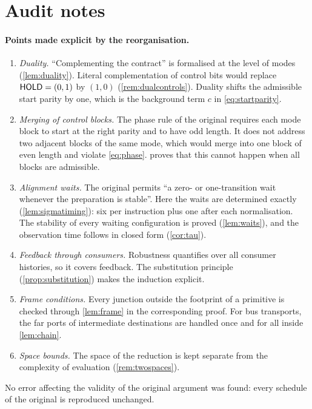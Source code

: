 \section{Audit notes}\label{app:audit}

\paragraph{Points made explicit by the reorganisation.}
\begin{enumerate}[label=(\arabic*)]
\item \emph{Duality.} ``Complementing the contract'' is formalised at the level of modes
  (\cref{lem:duality}). Literal complementation of control bits would replace $\textsf{HOLD}=(0,1)$ by
  $(1,0)$ (\cref{rem:dualcontrols}). Duality shifts the admissible start parity by one, which is the
  background term $c$ in \eqref{eq:startparity}.
\item \emph{Merging of control blocks.} The phase rule of the original requires each mode block to
  start at the right parity and to have odd length. It does not address two adjacent blocks of the
  same mode, which would merge into one block of even length and violate \eqref{eq:phase}.
   proves that this cannot happen when all blocks are admissible.
\item \emph{Alignment waits.} The original permits ``a zero- or one-transition wait whenever the
  preparation is stable''. Here the waits are determined exactly (\cref{lem:sigmatiming}): six per
  instruction plus one after each normalisation. The stability of every waiting configuration is
  proved (\cref{lem:waits}), and the observation time follows in closed form (\cref{cor:tau}).
\item \emph{Feedback through consumers.} Robustness quantifies over all consumer histories, so it
  covers feedback. The substitution principle (\cref{prop:substitution}) makes the induction
  explicit.
\item \emph{Frame conditions.} Every junction outside the footprint of a primitive is checked
  through \cref{lem:frame} in the corresponding proof. For bus transports, the far ports of
  intermediate destinations are handled once and for all inside \cref{lem:chain}.
\item \emph{Space bounds.} The space of the reduction is kept separate from the complexity of
  evaluation (\cref{rem:twospaces}).
\end{enumerate}
No error affecting the validity of the original argument was found: every schedule of the original
is reproduced unchanged.

